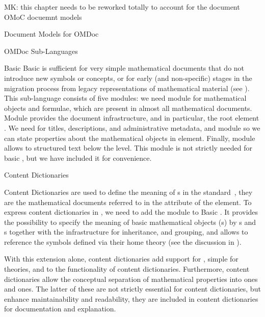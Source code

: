 \begin{oldpart}{MK: this chapter needs to be reworked totally to account for the document
    OMoC docuemnt models}
\begin{tchapter}[id=document-model]{Document Models for OMDoc}
\begin{tsection}[id=sub-languages]{OMDoc Sub-Languages}
\begin{tsubsection}[id=sub-languages:basic]{Basic {\omdoc}}
  Basic {\omdoc} is sufficient for very simple mathematical documents that do not
  introduce new symbols or concepts, or for early (and non-specific) stages in the
  migration process from legacy representations of mathematical material (see
  {}).  This {\omdoc} sub-language consists of five modules: we need
  module {} for mathematical objects and formulae, which are present in
  almost all mathematical documents. Module {} provides the document
  infrastructure, and in particular, the root element
  {}. We need {} for titles, descriptions, and
  administrative metadata, and module {} so we can state properties about
  the mathematical objects in {} element. Finally, module
  {} allows to structured text below the {} level.  This
  module is not strictly needed for basic {\omdoc}, but we have included it for
  convenience.
\end{tsubsection}

\begin{tsubsection}[id=sub-languages:cd]{{\omdoc} Content Dictionaries}
  
  Content Dictionaries are used to define the meaning of {s} in the
  {\openmath} standard~\cite{BusCapCar:2oms04}, they are the mathematical documents
  referred to in the {} attribute of the {}
  element.  To express content dictionaries in {\omdoc},
  we need to add the module {} to Basic {\omdoc}.  It provides the
  possibility to specify the meaning of basic mathematical objects ({s})
  by {s} and {s} together with the infrastructure for
  inheritance, and grouping, and allows to reference the symbols defined via their home
  theory (see the discussion in {}).
  
  With this extension alone, {\omdoc} content dictionaries add support for
  {}, simple {} for theories, and
  {} to the functionality of {\openmath} content
  dictionaries. Furthermore, {\omdoc} content dictionaries allow the conceptual separation
  of mathematical properties into {} ones and
  {} ones. The latter of these are not strictly essential
  for content dictionaries, but enhance maintainability and readability, they are included
  in {\openmath} content dictionaries for documentation and explanation.


\end{tsubsection}
\end{tsection}
\end{tchapter}
\end{oldpart}
